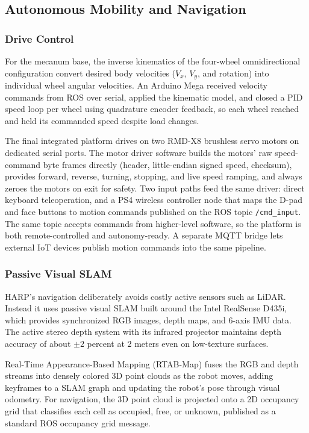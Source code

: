 \documentclass[11pt,a4paper]{article}
\begin{document}
\subsection{Autonomous Mobility and Navigation}

\subsubsection{Drive Control}

For the mecanum base, the inverse kinematics of the four-wheel omnidirectional configuration convert desired body velocities ($V_x$, $V_y$, and rotation) into individual wheel angular velocities. An Arduino Mega received velocity commands from ROS over serial, applied the kinematic model, and closed a PID speed loop per wheel using quadrature encoder feedback, so each wheel reached and held its commanded speed despite load changes.

The final integrated platform drives on two RMD-X8 brushless servo motors on dedicated serial ports. The motor driver software builds the motors' raw speed-command byte frames directly (header, little-endian signed speed, checksum), provides forward, reverse, turning, stopping, and live speed ramping, and always zeroes the motors on exit for safety. Two input paths feed the same driver: direct keyboard teleoperation, and a PS4 wireless controller node that maps the D-pad and face buttons to motion commands published on the ROS topic \texttt{/cmd\_input}. The same topic accepts commands from higher-level software, so the platform is both remote-controlled and autonomy-ready. A separate MQTT bridge lets external IoT devices publish motion commands into the same pipeline.

\subsubsection{Passive Visual SLAM}

HARP's navigation deliberately avoids costly active sensors such as LiDAR. Instead it uses passive visual SLAM built around the Intel RealSense D435i, which provides synchronized RGB images, depth maps, and 6-axis IMU data. The active stereo depth system with its infrared projector maintains depth accuracy of about $\pm 2$ percent at 2 meters even on low-texture surfaces.

Real-Time Appearance-Based Mapping (RTAB-Map) fuses the RGB and depth streams into densely colored 3D point clouds as the robot moves, adding keyframes to a SLAM graph and updating the robot's pose through visual odometry. For navigation, the 3D point cloud is projected onto a 2D occupancy grid that classifies each cell as occupied, free, or unknown, published as a standard ROS occupancy grid message.
\end{document}
